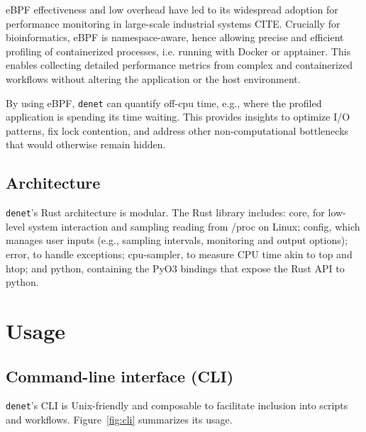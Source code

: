 \documentclass[10pt]{article}
\begin{document}
eBPF effectiveness and low overhead have led to its widespread adoption for performance monitoring in large-scale industrial systems {\color{red} CITE}. Crucially for bioinformatics, eBPF is namespace-aware, hence allowing precise and efficient profiling of containerized processes, i.e. running with Docker or apptainer. This enables collecting detailed performance metrics from complex and containerized workflows without altering the application or the host environment.

By using eBPF, \texttt{denet} can quantify off-cpu time, e.g., where the profiled application is spending its time waiting. This provides insights to optimize I/O patterns, fix lock contention, and address other non-computational bottlenecks that would otherwise remain hidden.

\subsection*{Architecture}

\texttt{denet}'s Rust architecture is modular. The Rust library includes: core, for low-level system interaction and sampling reading from /proc on Linux; config, which manages user inputs (e.g., sampling intervals, monitoring and output options); error, to handle exceptions; cpu-sampler, to measure CPU time akin to top and htop; and python, containing the PyO3 bindings that expose the Rust API to python.

\section*{Usage}

\subsection*{Command-line interface (CLI)}

\texttt{denet}'s CLI is Unix-friendly \cite{raymond1999cathedral} and composable to facilitate inclusion into scripts and workflows. Figure~\ref{fig:cli} summarizes its usage.\\
\end{document}
